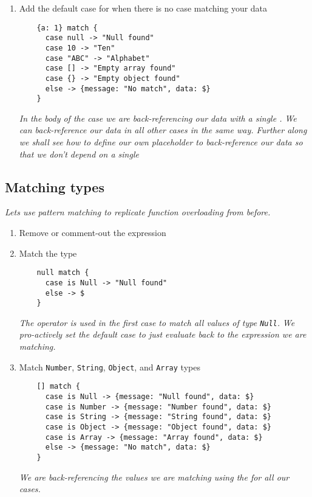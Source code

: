 \begin{enumerate}
\begin{lstlisting}
      case 10 -> "Ten"
      case "ABC" -> "Alphabet"
      case [] -> "Empty array found"
      case {} -> "Empty object found"
    }
  \end{lstlisting}
  \emph{
    We are getting errors because there is no case matching this expression.
  }
  \newline
  \emph{
    There is no way to match inner data of objects and arrays directly in a case--i.e. adding inner data at the case level will only result in syntax errors.
  }
\item Add the default case for when there is no case matching your data
  \begin{lstlisting}
    {a: 1} match {
      case null -> "Null found"
      case 10 -> "Ten"
      case "ABC" -> "Alphabet"
      case [] -> "Empty array found"
      case {} -> "Empty object found"
      else -> {message: "No match", data: $}
    }
  \end{lstlisting}
  \emph{
    In the body of the  case we are back-referencing our data with a single \ttt{\$}.  We can back-reference our data in all other cases in the same way.  Further along we shall see how to define our own placeholder to back-reference our data so that we don't depend on a single \ttt{\$}
  }
\end{enumerate}

\subsection{Matching types}
\emph{
  Lets use pattern matching to replicate function overloading from before.
}
\begin{enumerate}[resume*]
\item Remove or comment-out the expression
\item Match the  type
  \begin{lstlisting}
    null match {
      case is Null -> "Null found"
      else -> $
    }
  \end{lstlisting}
  \emph{
    The  operator is used in the first case to match all values of type \lstinline{Null}.
  }
  \newline
  \emph{
    We pro-actively set the default case to just evaluate back to the expression we are matching.
  }
\item Match \lstinline{Number}, \lstinline{String}, \lstinline{Object}, and \lstinline{Array} types
  \begin{lstlisting}
    [] match {
      case is Null -> {message: "Null found", data: $}
      case is Number -> {message: "Number found", data: $}
      case is String -> {message: "String found", data: $}
      case is Object -> {message: "Object found", data: $}
      case is Array -> {message: "Array found", data: $}
      else -> {message: "No match", data: $}
    }
  \end{lstlisting}
  \emph{
    We are back-referencing the values we are matching using the \ttt{\$} for all our cases.
  }
\end{enumerate}

